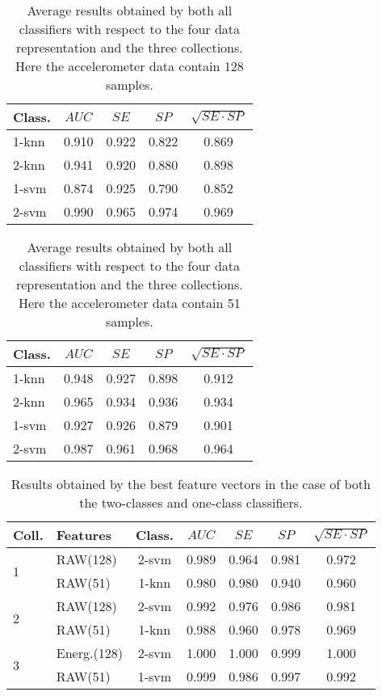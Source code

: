 \documentclass[twocolumn]{svjour3}          \smartqed  \usepackage[draft]{hyperref}
\begin{document}
  \begin{table}[tb]
\scriptsize
\centering
\begin{tabular}{lcccc}
	Class.&	$AUC$ &	$SE$ &	$SP$	&	$\sqrt{SE\cdot SP}$ \\
\hline 1-knn&	0.910&	0.922&	0.822&	0.869\\ 
[2pt] 
2-knn&	0.941&	0.920&	0.880&	0.898\\ 
[2pt] 
1-svm&	0.874&	0.925&	0.790&	0.852\\ 
[2pt] 
2-svm&	0.990&	0.965&	0.974&	0.969\\ 
[2pt] 
\hline 
\end{tabular}
\medskip
\caption{Average results obtained by both all classifiers with respect to the four data representation and the three collections. Here the accelerometer data contain 128 samples.}
\label{table:summary-3-128}
 \end{table}
 

  \begin{table}[tb]
\scriptsize
\centering
\begin{tabular}{lcccc}
	Class.&	$AUC$ &	$SE$ &	$SP$	&	$\sqrt{SE\cdot SP}$ \\
\hline 1-knn&	0.948&	0.927&	0.898&	0.912\\ 
[2pt] 
2-knn&	0.965&	0.934&	0.936&	0.934\\ 
[2pt] 
1-svm&	0.927&	0.926&	0.879&	0.901\\ 
[2pt] 
2-svm&	0.987&	0.961&	0.968&	0.964\\ 
[2pt] 
\hline 
\end{tabular}
\medskip
\caption{Average results obtained by both all classifiers with respect to the four data representation and the three collections. Here the accelerometer data contain 51 samples.}
\label{table:summary-3-51}
 \end{table}
 

 
 \begin{table}[t]
\scriptsize
\centering
\begin{tabular}{llccccc}
	Coll.&Features&Class.	&	$AUC$ &	$SE$ &	$SP$	&	$\sqrt{SE\cdot SP}$ \\
\hline \multirow{2}{*}{1}	&RAW(128)	&2-svm&0.989&	0.964&	0.981&	0.972\\ 
&RAW(51)	&1-knn&	0.980&0.980&	0.940&	0.960\\  
[2pt]  
 \hline
\multirow{2}{*}{2}	&RAW(128)	&2-svm&	0.992&	0.976&	0.986&	0.981\\ 
&RAW(51)	&1-knn&	0.988&	0.960&	0.978&	0.969\\ 
[2pt]  
 \hline
\multirow{2}{*}{3}	&Energ.(128)	&2-svm&	1.000&	1.000&	0.999&	1.000\\ 
&RAW(51)	&1-svm&	0.999&	0.986&	0.997&	0.992\\ 
[2pt] 
\hline
\end{tabular}
\medskip
\caption{Results obtained by the best feature vectors in the case of both the two-classes and one-class classifiers.}
\label{table:summary}
 \end{table}
\end{document}
